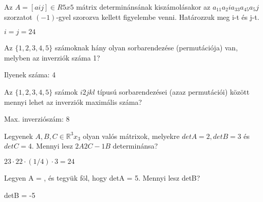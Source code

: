 \begin{frame}
  \begin{tcolorbox}[title={7/2. {\symrook}}]
    Az $A = [aij] \in R5x5$ mátrix determinánsának kiszámolásakor az $a_11a_2ia_33a_45a_5j$ szorzatot $(-1)$-gyel szorozva kellett figyelembe venni. Határozzuk meg i-t és j-t.
  \tcblower

    \mmedskip 
    
    $i = j =
2 4$
  \end{tcolorbox}
\end{frame}


\begin{frame}
  \begin{tcolorbox}[title={7/3. {\symqueen}}]
    Az $\{1,2,3,4,5\}$ számoknak hány olyan sorbarendezése (permutációja) van, melyben az inverziók száma 1?
  \tcblower

    \mmedskip 
    
     Ilyenek száma: 4
  \end{tcolorbox}
\end{frame}


\begin{frame}
  \begin{tcolorbox}[title={7/4. {\symqueen}}]
    Az $\{1,2,3,4,5\}$ számok $i2jkl$ típusú sorbarendezései (azaz permutációi) között mennyi lehet az inverziók maximális száma?
  \tcblower

    \mmedskip 
    Max. inverziószám: 8
  \end{tcolorbox}
\end{frame}

\begin{frame}
  \begin{tcolorbox}[title={7/5. {\symknight}}]
    Legyenek $A,B,C \in \mathbb{R}^3x_3$ olyan valós mátrixok, melyekre $detA = 2, detB = 3$ és $detC = 4$. Mennyi lesz $2A2C-1B$ determinánsa?
  \tcblower

    \mmedskip 
    
     $23  \cdot 22  \cdot (1/4) \cdot 3 = 24$
  \end{tcolorbox}
\end{frame}

\begin{frame}
  \begin{tcolorbox}[title={7/6. {\symrook}}]
    Legyen A =
, és
tegyük föl, hogy detA = 5. Mennyi lesz detB?

  \tcblower

    \mmedskip 
    
     detB = -5
  \end{tcolorbox}
\end{frame}


